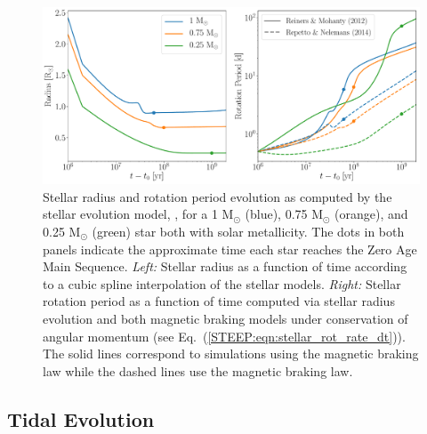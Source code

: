 \begin{figure}
	\includegraphics[width=\columnwidth]{stellar_example.pdf}
    \caption{Stellar radius and rotation period evolution as computed by the stellar evolution model, \stellar, for a 1 M$_{\odot}$ (blue), 0.75 M$_{\odot}$ (orange), and 0.25 M$_{\odot}$ (green) star both with solar metallicity. The dots in both panels indicate the approximate time each star reaches the Zero Age Main Sequence.  {\it Left:} Stellar radius as a function of time according to a cubic spline interpolation of the \citet{Baraffe2015} stellar models.  {\it Right:} Stellar rotation period as a function of time computed via stellar radius evolution and both magnetic braking models under conservation of angular momentum (see Eq.~(\ref{STEEP:eqn:stellar_rot_rate_dt})).  The solid lines correspond to simulations using the \citet{Reiners2012} magnetic braking law while the dashed lines use the \citet{Repetto2014} magnetic braking law.}
    \label{STEEP:fig:stellar_example}
\end{figure}


\subsection{Tidal Evolution} \label{STEEP:sec:tidal_evolution}

